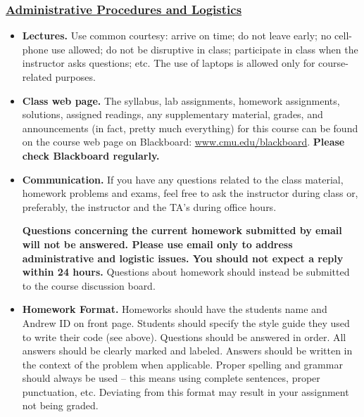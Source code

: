 \documentclass[11pt]{article}
\begin{document}
\subsubsection*{\underline{Administrative Procedures and Logistics}}
\begin{itemize}
\item {\bf Lectures.} Use common courtesy: arrive on time; do not leave early; no cell-phone use allowed; do not be disruptive in class; participate in class when the instructor asks questions; etc.  The  use of laptops is allowed only for course-related purposes.
    
\item {\bf Class web page.} The syllabus, lab assignments, homework assignments, solutions, assigned readings, any supplementary material, grades, and announcements (in fact, pretty much everything) for this course can be found on the course web page on Blackboard:  \url{www.cmu.edu/blackboard}.  {\bf Please check Blackboard regularly.}



\item {\bf Communication.} If you have any questions related to the class material, homework problems and exams, feel free to ask the instructor during class or, preferably, the instructor and the TA's during office hours. 

{\bf Questions concerning the current homework submitted by email will not be answered. Please use email only to address administrative and logistic issues. You should not expect a reply within 24 hours.}  Questions about homework should instead be submitted to the course discussion board.


\item {\bf Homework Format.}  Homeworks should have the students name and Andrew ID on front page.  Students should specify the style guide they used to write their code (see above).  Questions should be answered in order.  All answers should be clearly marked and labeled.  Answers should be written in the context of the problem when applicable.  Proper spelling and grammar should always be used -- this means using complete sentences, proper punctuation, etc.  Deviating from this format may result in your assignment not being graded.


\end{itemize}
\end{document}
